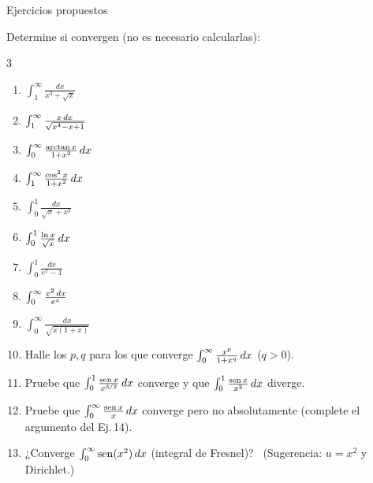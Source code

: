 \documentclass[10pt,aspectratio=169]{beamer}
\begin{document}
\begin{frame}{Ejercicios propuestos}
  \small
  \begin{ejercicio}
    Determine si convergen (no es necesario calcularlas):
    \begin{multicols}{3}
    \begin{enumerate}
      \item $\int_1^\infty\frac{dx}{x^3+\sqrt x}$
      \item $\int_1^\infty\frac{x\,dx}{\sqrt{x^4-x+1}}$
      \item $\int_0^\infty\frac{\arctan x}{1+x^2}\,dx$
      \item $\int_1^\infty\frac{\cos^2x}{1+x^2}\,dx$
      \item $\int_0^1\frac{dx}{\sqrt{x}+x^3}$
      \item $\int_0^1\frac{\ln x}{\sqrt x}\,dx$
      \item $\int_0^1\frac{dx}{e^x-1}$
      \item $\int_0^\infty\frac{x^2\,dx}{e^x}$
      \item $\int_0^\infty\frac{dx}{\sqrt{x(1+x)}}$
    \end{enumerate}
    \end{multicols}
  \end{ejercicio}
  \begin{ejercicio}
    \begin{enumerate}
      \setcounter{enumi}{9}
      \item Halle los $p,q$ para los que converge $\int_0^\infty\frac{x^{p}}{1+x^{q}}\,dx$ ($q>0$).
      \item Pruebe que $\int_0^1\frac{\operatorname{sen} x}{x^{3/2}}\,dx$ converge y que $\int_0^1\frac{\operatorname{sen} x}{x^{2}}\,dx$ diverge.
      \item Pruebe que $\int_0^\infty\frac{\operatorname{sen} x}{x}\,dx$ converge pero no absolutamente (complete el argumento del Ej.\,14).
      \item ¿Converge $\int_0^\infty\operatorname{sen}(x^2)\,dx$ (integral de Fresnel)? \ (Sugerencia: $u=x^2$ y Dirichlet.)
    \end{enumerate}
  \end{ejercicio}
\end{frame}
\end{document}

